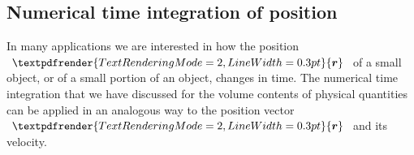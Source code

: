 \documentclass[a4paper,12pt,%
onecolumn,oneside,titlepage,%
british%
]{memoir}
\renewcommand*{\bm}[1]{\textpdfrender{TextRenderingMode=2,LineWidth=0.3pt}{\boldsymbol{#1}}}
\renewcommand*{\|}[1][]{\nonscript\:#1\vert\nonscript\:\mathopen{}}
\newcommand*{\yr}{\bm{r}}
\begin{document}
%

\subsection{Numerical time integration of position}
\label{sec:position_integration}

In many applications we are interested in how the position $\yr$ of a small object, or of a small portion of an object, changes in time. The numerical time integration that we have discussed for the volume contents of physical quantities can be applied in an analogous way to the position vector $\yr$ and its velocity.
\end{document}
